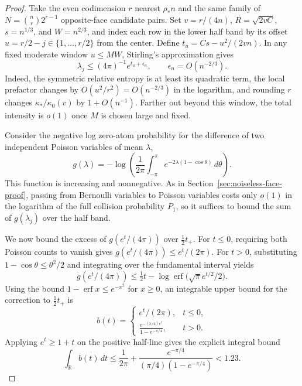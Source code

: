 \begin{proof}
Take the even codimension \(r\) nearest \(\rho_*n\) and the same family of \(N=\binom nr2^{r-1}\) opposite-face candidate pairs. Set \(v=r/(4n)\), \(R=\sqrt{2vC}\), \(s=n^{1/3}\), and \(W=n^{2/3}\), and index each row in the lower half band by its offset \(u=r/2-j\in\{1,\ldots,r/2\}\) from the center. Define \(t_u=Cs-u^2/(2vn)\). In any fixed moderate window \(u\le MW\), Stirling's approximation gives
\[
 \lambda_j\le (4\pi)^{-1}e^{t_u+\epsilon_n},
 \qquad \epsilon_n=O(n^{-2/3}).
\]
Indeed, the symmetric relative entropy is at least its quadratic term, the local prefactor changes by \(O(u^2/r^2)=O(n^{-2/3})\) in the logarithm, and rounding \(r\) changes \(\kappa_*/\kappa_0(v)\) by \(1+O(n^{-1})\). Farther out beyond this window, the total intensity is \(o(1)\) once \(M\) is chosen large and fixed.

Consider the negative log zero-atom probability for the difference of two independent Poisson variables of mean \(\lambda\),
\[
 g(\lambda)=-\log\left(\frac{1}{2\pi}
       \int_{-\pi}^{\pi}e^{-2\lambda(1-\cos\theta)}\,d\theta\right).
\]
This function is increasing and nonnegative. As in Section~\ref{sec:noiseless-face-proof}, passing from Bernoulli variables to Poisson variables costs only \(o(1)\) in the logarithm of the full collision probability \(P_1\), so it suffices to bound the sum of \(g(\lambda_j)\) over the half band.

We now bound the excess of \(g(e^t/(4\pi))\) over \(\tfrac12t_+\). For \(t\le0\), requiring both Poisson counts to vanish gives \(g(e^t/(4\pi))\le e^t/(2\pi)\). For \(t>0\), substituting \(1-\cos\theta\le\theta^2/2\) and integrating over the fundamental interval yields
\[
 g(e^t/(4\pi))\le
 \tfrac12 t-\log\operatorname{erf}\bigl(\sqrt{\pi}e^{t/2}/2\bigr).
\]
Using the bound \(1-\operatorname{erf}x\le e^{-x^2}\) for \(x\ge0\), an integrable upper bound for the correction to \(\tfrac12t_+\) is
\[
 b(t)=
 \begin{cases}
 e^t/(2\pi),&t\le0,\\
 \displaystyle
 \frac{e^{-(\pi/4)e^t}}{1-e^{-\pi/4}},&t>0.
 \end{cases}
\]
Applying \(e^t\ge1+t\) on the positive half-line gives the explicit integral bound
\[
 \int_{\mathbb R} b(t)\,dt
 \le \frac1{2\pi}+
   \frac{e^{-\pi/4}}{(\pi/4)(1-e^{-\pi/4})}<1.23 .
\]


\end{proof}
